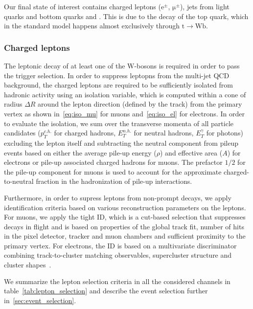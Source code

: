 Our final state of interest contains charged leptons ($\mathrm{e}^\pm$, $\mathrm{\mu}^\pm$), jets from light quarks and bottom quarks and \MET. This is due to the decay of the top quark, which in the standard model happens almost exclusively through $\mathrm{t} \rightarrow \mathrm{W} \mathrm{b}$.

\subsubsection{Charged leptons}
\label{sec:object_id_lep}

The leptonic decay of at least one of the W-bosons is required in order to pass the trigger selection. In order to suppress leptopns from the multi-jet QCD background, the charged leptons are required to be sufficiently isolated from hadronic activity using an isolation variable, which is computed within a cone of radius $\Delta R$ around the lepton direction (defined by the track) from the primary vertex as shown in~\cref{eq:iso_mu} for muons and~\cref{eq:iso_el} for electrons. In order to evaluate the isolation, we sum over the transverse momenta of all particle candidates ($p_T^{c.h.}$ for charged hadrons, $E_T^{n.h.}$ for neutral hadrons, $E_T^{\gamma}$ for photons) excluding the lepton itself and subtracting the neutral component from pileup events based on either the average pile-up energy ($\rho$) and effective area ($A$) for electrons or pile-up associated charged hadrons for muons. The prefactor $1/2$ for the pile-up component for muons is used to account for the approximate charged-to-neutral fraction in the hadronization of pile-up interactions\cite{CMS:2012}.

Furthermore, in order to supress leptons from non-prompt decays, we apply identification criteria based on various reconstruction parameters on the leptons. For muons, we apply the tight ID, which is a cut-based selection that suppresses decays in flight and is based on properties of the global track fit, number of hits in the pixel detector, tracker and muon chambers and sufficient proximity to the primary vertex\cite{Chatrchyan:2012xi,CMS:2017_muon_pog}. For electrons, the ID is based on a multivariate discriminator combining track-to-cluster matching observables, supercluster structure and cluster shapes~\cite{Khachatryan:2015hwa,CMS:2017_egamma_pog}.

We summarize the lepton selection criteria in all the considered channels in table~\cref{tab:lepton_selection} and describe the event selection further in~\cref{sec:event_selection}.

